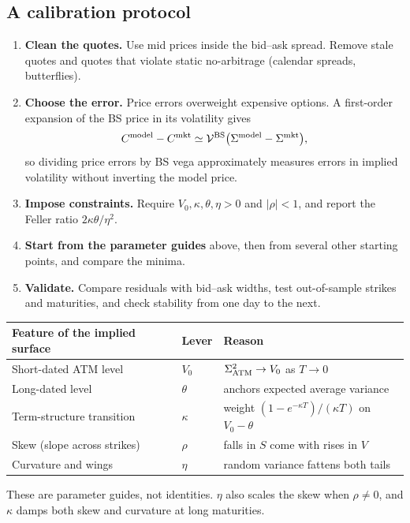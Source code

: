 \documentclass[10pt]{article}
\theoremstyle{definition}\newtheorem{definition}{Definition}[section]
\begin{document}
\subsection{A calibration protocol}
\begin{enumerate}
\item \textbf{Clean the quotes.} Use mid prices inside the bid--ask spread.
Remove stale quotes and quotes that violate static no-arbitrage (calendar
spreads, butterflies).
\item \textbf{Choose the error.} Price errors overweight expensive options.
A first-order expansion of the BS price in its volatility gives
\[
C^{\rm model}-C^{\rm mkt}\simeq\mathcal V^{\rm BS}\bigl(\Sigma^{\rm model}-\Sigma^{\rm mkt}\bigr),
\]
so dividing price errors by BS vega approximately measures errors in implied
volatility without inverting the model price.
\item \textbf{Impose constraints.} Require \(V_0,\kappa,\theta,\eta>0\) and
\(|\rho|<1\), and report the Feller ratio \(2\kappa\theta/\eta^2\).
\item \textbf{Start from the parameter guides} above, then from several
other starting points, and compare the minima.
\item \textbf{Validate.} Compare residuals with bid--ask widths, test
out-of-sample strikes and maturities, and check stability from one day to the next.
\end{enumerate}

\begin{center}
\begin{tabular}{L{.34\textwidth}L{.08\textwidth}L{.46\textwidth}}
\toprule Feature of the implied surface & Lever & Reason\\\midrule
Short-dated ATM level & \(V_0\) & \(\Sigma_{\rm ATM}^2\to V_0\) as \(T\to0\)\\[.3em]
Long-dated level & \(\theta\) & anchors expected average variance\\[.3em]
Term-structure transition & \(\kappa\) & weight \((1-e^{-\kappa T})/(\kappa T)\) on \(V_0-\theta\)\\[.3em]
Skew (slope across strikes) & \(\rho\) & falls in \(S\) come with rises in \(V\)\\[.3em]
Curvature and wings & \(\eta\) & random variance fattens both tails\\\bottomrule
\end{tabular}
\end{center}
These are parameter guides, not identities. \(\eta\) also scales the skew
when \(\rho\neq0\), and \(\kappa\) damps both skew and curvature at long maturities.
\end{document}
